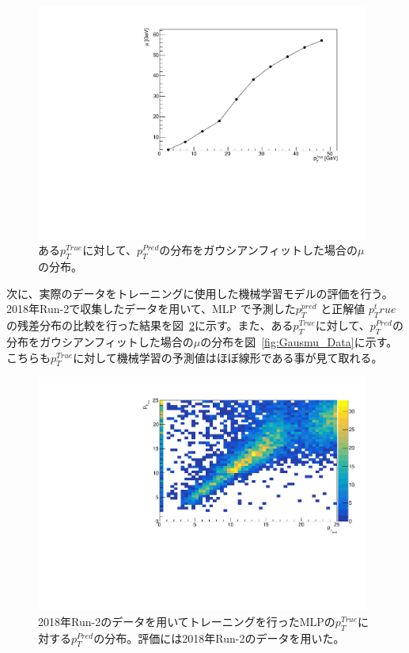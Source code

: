 \begin{figure}[tb]
  \centering
  \includegraphics[clip, width=11cm]{fig/4/tp_Gausmean_MC.pdf}
  \caption{ある$p_T^{True}$に対して、$p_T^{Pred}$の分布をガウシアンフィットした場合の$\mu$の分布。}
  \label{fig:Gausmu_MC}
\end{figure}

次に、実際のデータをトレーニングに使用した機械学習モデルの評価を行う。
2018年Run-2で収集したデータを用いて、MLP で予測した$p_{T}^{pred}$ と正解値 $p_{T}^true$ の残差分布の比較を行った結果を図~\ref{fig:zannsa_25_Data}に示す。また、ある$p_T^{True}$に対して、$p_T^{Pred}$の分布をガウシアンフィットした場合の$\mu$の分布を図~\ref{fig:Gausmu_Data}に示す。こちらも$p_T^{True}$に対して機械学習の予測値はほぼ線形である事が見て取れる。

\begin{figure}[htb]
  \centering
  \includegraphics[clip, width=11cm]{fig/4/zansa_25_DESDM.pdf}
  \caption{2018年Run-2のデータを用いてトレーニングを行ったMLPの$p_{T}^{True}$に対する$p_{T}^{Pred}$の分布。評価には2018年Run-2のデータを用いた。}
  \label{fig:zannsa_25_Data}
\end{figure}


